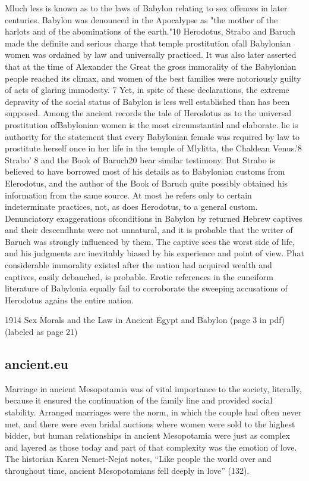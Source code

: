 \documentclass[11pt]{article}
\begin{document}
Mluch less is known as to the laws of Babylon relating to sex offences in later centuries. Babylon was denounced in the Apocalypse as
"the mother of the harlots and of the abominations of the earth."10
Herodotus, Strabo and Baruch made the definite and serious charge that
temple prostitution ofall Babylonian women was ordained by law and
universally practiced. It was also later asserted that at the time of
Alexander the Great the gross immorality of the Babylonian people
reached its climax, and women of the best families were notoriously
guilty of acts of glaring immodesty. 7 Yet, in spite of these declarations, the extreme depravity of the social status of Babylon is less well
established than has been supposed. Among the ancient records the
tale of Herodotus as to the universal prostitution ofBabylonian women
is the most circumstantial and elaborate. lie is authority for the statement that every Babylonian female was required by law to prostitute
herself once in her life in the temple of Mlylitta, the Chaldean Venus.'8
Strabo' 8 and the Book of Baruch20 bear similar testimony. But Strabo
is believed to have borrowed most of his details as to Babylonian customs from Elerodotus, and the author of the Book of Baruch quite possibly
obtained his information from the same source. At most he refers
only to certain indeterminate practices, not, as does Herodotus, to a general custom. Denunciatory exaggerations ofconditions in Babylon by
returned Hebrew captives and their descendhnts were not unnatural,
and it is probable that the writer of Baruch was strongly influenced by
them. The captive sees the worst side of life, and his judgments arc
inevitably biased by his experience and point of view. Phat considerable
immorality existed after the nation had acquired wealth and captives,
easily debauched, is probable. Erotic references in the cuneiform literature of Babylonia equally fail to corroborate the sweeping accusations
of Herodotus agains the entire nation.


1914
Sex Morals and the Law in Ancient Egypt and
Babylon (page 3 in pdf) (labeled as page 21)




\subsection{ancient.eu}
Marriage in ancient Mesopotamia was of vital importance to the society, literally, because it ensured the continuation of the family line and provided social stability. Arranged marriages were the norm, in which the couple had often never met, and there were even bridal auctions where women were sold to the highest bidder, but human relationships in ancient Mesopotamia were just as complex and layered as those today and part of that complexity was the emotion of love. The historian Karen Nemet-Nejat notes, “Like people the world over and throughout time, ancient Mesopotamians fell deeply in love” (132).
\end{document}

